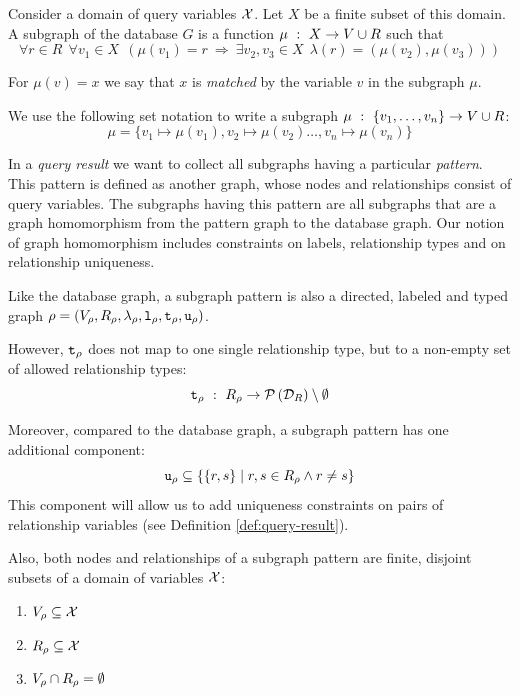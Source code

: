 \begin{definition}[Subgraph]
Consider a domain of query variables $\mathcal{X}$. Let $X$ be a finite subset of
this domain.
A subgraph of the database $G$ is a function
$\mu ~:~ X \rightarrow V \cup R$
such that
\[
  \forall r \in R ~~ \forall v_1 \in X ~~ (\mu(v_1) = r ~\Rightarrow~
    \exists v_2, v_3 \in X ~~ \lambda(r) = (\mu(v_2), \mu(v_3)))
\]

For $\mu(v) = x$ we say that $x$ is \emph{matched} by the variable $v$ in
the subgraph $\mu$.

We use the following set notation to write a subgraph
$\mu ~:~ \{v_1, \ldots, v_n\} \rightarrow V \cup R$:
\[
  \mu = \{ v_1 \mapsto \mu(v_1), v_2 \mapsto \mu(v_2) \ldots, v_n \mapsto \mu(v_n) \}
\]


\end{definition}

In a \emph{query result} we want to collect all subgraphs having a
particular \emph{pattern}.
This pattern is defined as another graph, whose nodes and relationships consist
of query variables. The subgraphs having this pattern are all subgraphs that
are a graph homomorphism from the pattern graph to the database graph.
Our notion of graph homomorphism includes constraints on labels,
relationship types and on relationship uniqueness.

\begin{definition}
Like the database graph, a subgraph pattern is also a directed, labeled
and typed graph
$\rho = (V_\rho, R_\rho, \lambda_\rho, \texttt{l}_\rho, \texttt{t}_\rho, \texttt{u}_\rho)$.

However, $\texttt{t}_\rho$ does not map to one single relationship type,
but to a non-empty set of allowed relationship types:
\[
  \texttt{t}_\rho ~:~ R_\rho \rightarrow \mathcal{P}\left(\mathcal{D}_R\right) \setminus \emptyset
\]

Moreover, compared to the database graph, a subgraph pattern has one additional component:
\[
  \texttt{u}_\rho \subseteq \{ \{r, s\} \mid r,s \in R_\rho \land r \not = s \}
\]
This component will allow us to add uniqueness constraints on pairs of
relationship variables (see Definition \ref{def:query-result}).

Also, both nodes and relationships of a subgraph pattern are finite,
disjoint subsets of a domain of variables $\mathcal{X}$:
\begin{enumerate}
  \item $V_\rho \subseteq \mathcal{X}$
  \item $R_\rho \subseteq \mathcal{X}$
  \item $V_\rho \cap R_\rho = \emptyset$
\end{enumerate}
\end{definition}

